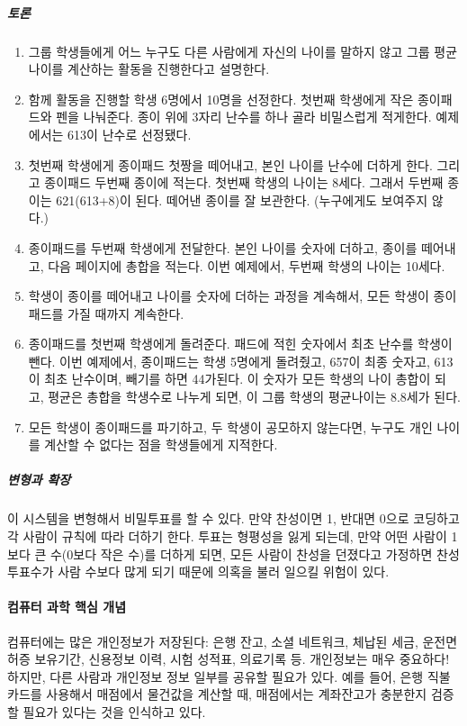 \documentclass[]{article}
\begin{document}
\subparagraph{토론}\label{section-231}

\begin{enumerate}
\item
  그룹 학생들에게 어느 누구도 다른 사람에게 자신의 나이를 말하지 않고
  그룹 평균나이를 계산하는 활동을 진행한다고 설명한다.
\item
  함께 활동을 진행할 학생 6명에서 10명을 선정한다. 첫번째 학생에게 작은
  종이패드와 펜을 나눠준다. 종이 위에 3자리 난수를 하나 골라 비밀스럽게
  적게한다. 예제에서는 613이 난수로 선정됐다.
\item
  첫번째 학생에게 종이패드 첫짱을 떼어내고, 본인 나이를 난수에 더하게
  한다. 그리고 종이패드 두번째 종이에 적는다. 첫번째 학생의 나이는
  8세다. 그래서 두번째 종이는 621(613+8)이 된다. 떼어낸 종이를 잘
  보관한다. (누구에게도 보여주지 않다.)
\item
  종이패드를 두번째 학생에게 전달한다. 본인 나이를 숫자에 더하고, 종이를
  떼어내고, 다음 페이지에 총합을 적는다. 이번 예제에서, 두번째 학생의
  나이는 10세다.
\item
  학생이 종이를 떼어내고 나이를 숫자에 더하는 과정을 계속해서, 모든
  학생이 종이패드를 가질 때까지 계속한다.
\item
  종이패드를 첫번째 학생에게 돌려준다. 패드에 적힌 숫자에서 최초 난수를
  학생이 뺀다. 이번 예제에서, 종이패드는 학생 5명에게 돌려줬고, 657이
  최종 숫자고, 613이 최초 난수이며, 빼기를 하면 44가된다. 이 숫자가 모든
  학생의 나이 총합이 되고, 평균은 총합을 학생수로 나누게 되면, 이 그룹
  학생의 평균나이는 8.8세가 된다.
\item
  모든 학생이 종이패드를 파기하고, 두 학생이 공모하지 않는다면, 누구도
  개인 나이를 계산할 수 없다는 점을 학생들에게 지적한다.
\end{enumerate}

\subparagraph{변형과 확장}\label{section-232}

이 시스템을 변형해서 비밀투표를 할 수 있다. 만약 찬성이면 1, 반대면
0으로 코딩하고 각 사람이 규칙에 따라 더하기 한다. 투표는 형평성을 잃게
되는데, 만약 어떤 사람이 1보다 큰 수(0보다 작은 수)를 더하게 되면, 모든
사람이 찬성을 던졌다고 가정하면 찬성 투표수가 사람 수보다 많게 되기
때문에 의혹을 불러 일으킬 위험이 있다.

\mbox{}\paragraph{컴퓨터 과학 핵심 개념}\label{section-233}

컴퓨터에는 많은 개인정보가 저장된다: 은행 잔고, 소셜 네트워크, 체납된
세금, 운전면허증 보유기간, 신용정보 이력, 시험 성적표, 의료기록 등.
개인정보는 매우 중요하다! 하지만, 다른 사람과 개인정보 정보 일부를
공유할 필요가 있다. 예를 들어, 은행 직불카드를 사용해서 매점에서
물건값을 계산할 때, 매점에서는 계좌잔고가 충분한지 검증할 필요가 있다는
것을 인식하고 있다.
\end{document}
